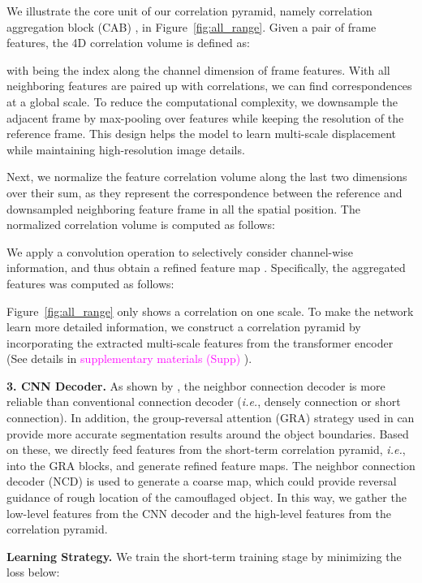 \documentclass[10pt,twocolumn,letterpaper]{article}
\def\ie{\emph{i.e.}}
\newcommand{\supp}[1]{\textcolor{magenta}{#1}}
\def\figref#1{Figure~\ref{#1}}
\begin{document}
We illustrate the core unit of our correlation pyramid, namely correlation aggregation block (CAB) , in \figref{fig:all_range}.
Given a pair of frame features, the 4D correlation volume  is defined as:

with  being the index along the channel dimension of frame features. With all neighboring features are paired up with correlations, we can find correspondences at a global scale. To reduce the computational complexity, 
we downsample the adjacent frame by max-pooling over features while keeping the resolution of the reference frame. This design helps the model to learn multi-scale displacement while maintaining high-resolution image details. 

Next, we normalize the feature correlation volume  along the last two dimensions  over their sum, as they represent the correspondence between the reference and downsampled neighboring feature frame in all the spatial position. The normalized correlation volume is computed as follows:


We apply a convolution operation  to selectively consider channel-wise information, and thus obtain a refined feature map . Specifically, the aggregated features  was computed as follows:


\figref{fig:all_range} only shows a correlation on one scale. To make the network learn more detailed information, we construct a correlation pyramid  by incorporating the extracted multi-scale features from the transformer encoder (See details in \supp{supplementary materials (Supp)} ). 


\noindent\textbf{3. CNN Decoder.}
As shown  by \cite{fan2021concealed}, the neighbor connection decoder is more reliable than conventional connection decoder (\ie, densely connection or short connection). In addition, the group-reversal attention (GRA) strategy used in \cite{fan2021concealed} can provide more accurate segmentation results around the object boundaries. 
Based on these, we directly feed features from the short-term correlation pyramid, \ie,  into the GRA blocks, and generate  refined feature maps. The neighbor connection decoder (NCD) is used to generate a coarse map, which could provide reversal guidance of rough location of the camouflaged object. In this way, we gather the low-level features from the CNN decoder and the high-level features from the correlation pyramid.  



\noindent\textbf{Learning Strategy.}
We train the short-term training stage by minimizing the loss below: 
\end{document}
